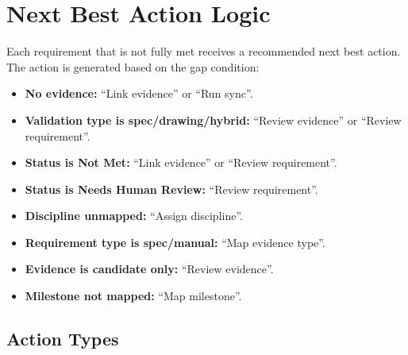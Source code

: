 \documentclass[10pt,letterpaper]{article}
\begin{document}
\section{Next Best Action Logic}

Each requirement that is not fully met receives a recommended next best action. The action is
generated based on the gap condition:

\begin{itemize}
  \item \textbf{No evidence:} ``Link evidence'' or ``Run sync''.
  \item \textbf{Validation type is spec/drawing/hybrid:} ``Review evidence'' or ``Review requirement''.
  \item \textbf{Status is Not Met:} ``Link evidence'' or ``Review requirement''.
  \item \textbf{Status is Needs Human Review:} ``Review requirement''.
  \item \textbf{Discipline unmapped:} ``Assign discipline''.
  \item \textbf{Requirement type is spec/manual:} ``Map evidence type''.
  \item \textbf{Evidence is candidate only:} ``Review evidence''.
  \item \textbf{Milestone not mapped:} ``Map milestone''.
\end{itemize}

\subsection{Action Types}
\end{document}
